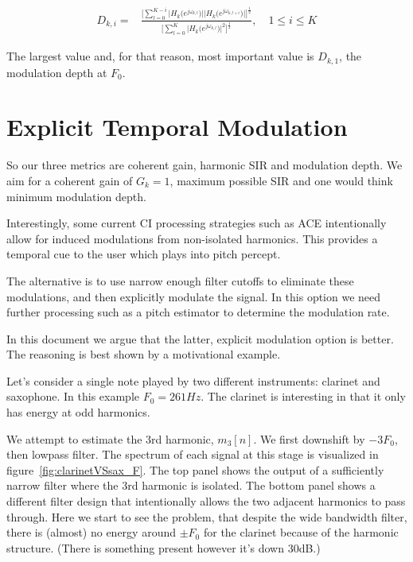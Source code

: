 \documentclass [11pt, proquest] {uwthesis}[2015/03/03]
\begin{document}
\begin{align}
D_{k,i} =& \frac{\Bigg[ \sum\limits_{l=0}^{K-i} \Big|H_k\big(e^{j\omega_{k,l}}\big)\Big| \Big|H_k\big(e^{j\omega_{k,l+i}}\big)\Big|\Bigg]^\frac{1}{2}}
{\Bigg[ \sum\limits_{l=0}^K \Big|H_k\big(e^{j\omega_{k,l}}\big)\Big|^2 \Bigg] ^ \frac{1}{2}}, \quad 1 \leq i \leq K
\end{align}

The largest value and, for that reason, most important value is $D_{k,1}$, the modulation depth at $F_0$.

\section{Explicit Temporal Modulation}

So our three metrics are coherent gain, harmonic SIR and modulation depth.  We aim for a coherent gain of $G_k = 1$, maximum possible SIR and one would think minimum modulation depth.

Interestingly, some current CI processing strategies such as ACE intentionally allow for induced modulations from non-isolated harmonics.  This provides a temporal cue to the user which plays into pitch percept.

The alternative is to use narrow enough filter cutoffs to eliminate these modulations, and then explicitly modulate the signal.  In this option we need further processing such as a pitch estimator to determine the modulation rate.

In this document we argue that the latter, explicit modulation option is better.  The reasoning is best shown by a motivational example.

Let's consider a single note played by two different instruments: clarinet and saxophone.  In this example $F_0 = 261Hz$.  The clarinet is interesting in that it only has energy at odd harmonics.

We attempt to estimate the 3rd harmonic, $m_3[n]$.  We first downshift by $-3F_0$, then lowpass filter.  The spectrum of each signal at this stage is visualized in figure~\ref{fig:clarinetVSsax_F}.  The top panel shows the output of a sufficiently narrow filter where the 3rd harmonic is isolated.  The bottom panel shows a different filter design that intentionally allows the two adjacent harmonics to pass through.  Here we start to see the problem, that despite the wide bandwidth filter, there is (almost) no energy around $\pm F_0$ for the clarinet because of the harmonic structure.  (There is something present however it's down 30dB.)
\end{document}
